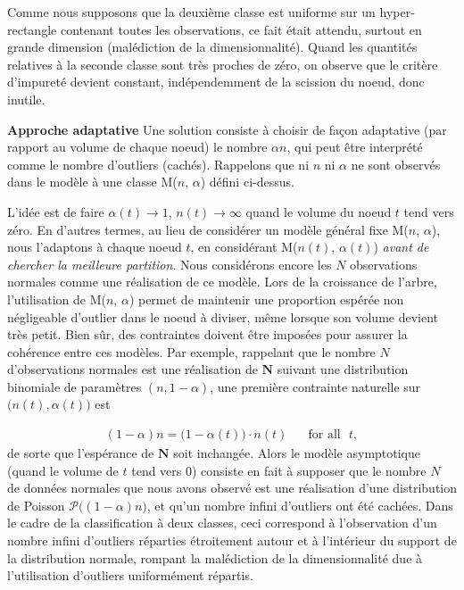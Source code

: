 \documentclass[a4paper, 12pt]{article}
\def\mb{\mathbf}
\begin{document}
Comme nous supposons que la deuxième classe est uniforme sur un hyper-rectangle contenant toutes les observations, ce fait était attendu, surtout en grande dimension (malédiction de la dimensionnalité). Quand les quantités relatives à la seconde classe sont très proches de zéro, on observe que le critère d'impureté devient constant, indépendemment de la scission du noeud, donc inutile.

\textbf{Approche adaptative}
%
Une solution consiste à choisir de façon adaptative (par rapport au volume de chaque noeud) le nombre $\alpha n $, qui peut être interprété comme le nombre d'outliers (cachés). Rappelons que ni $n$ ni $\alpha $ ne sont observés dans le modèle à une classe M($n$, $\alpha$) défini ci-dessus.

L'idée est de faire $\alpha(t) \to 1$, $n(t) \to \infty$ quand le volume du noeud $t$ tend vers zéro. 
En d'autres termes, au lieu de considérer un modèle général fixe M($n$, $\alpha$), nous l'adaptons à chaque noeud $t$, en considérant M($n(t)$, $\alpha(t)$) \emph{avant de chercher la meilleure partition}. Nous considérons encore les $N$ observations normales comme une réalisation de ce modèle. Lors de la croissance de l'arbre, l'utilisation de M($n$, $\alpha$) permet de maintenir une proportion espérée non négligeable d'outlier dans le noeud à diviser, même lorsque son volume devient très petit. Bien sûr, des contraintes doivent être imposées pour assurer la cohérence entre ces modèles. Par exemple, rappelant que le nombre $N$ d'observations normales est une réalisation de $\mb N $ suivant une distribution binomiale de paramètres $ (n, 1-\alpha) $, une première contrainte naturelle sur $\big(n(t), \alpha(t)\big)$  est

\begin{align}
\label{resume_fr:constraint1}
(1-\alpha)n = \big(1-\alpha(t)\big) \cdot n(t) \text{~~~~~for all~~} t,
\end{align}
de sorte que l'espérance de $\mb N$ soit inchangée.
Alors le modèle asymptotique (quand le volume de $t$ tend vers $0$) consiste en fait à supposer que le nombre $N$ de données normales que nous avons observé est une réalisation d'une distribution de Poisson $\mathcal{P}\big((1-\alpha)n\big)$,
et qu'un nombre infini d'outliers ont été cachées. Dans le cadre de la classification à deux classes, ceci correspond à l'observation d'un nombre infini d'outliers réparties étroitement autour et à l'intérieur du support de la distribution normale, rompant la malédiction de la dimensionnalité due à l'utilisation d'outliers uniformément répartis.
\end{document}
